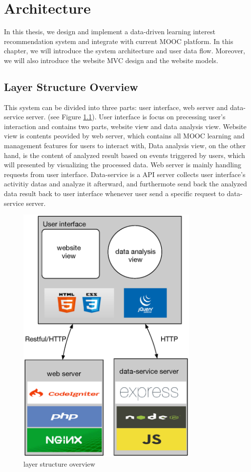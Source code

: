 \chapter{Architecture}
In this thesis, we design and implement a data-driven learning interest recommendation system and integrate with current MOOC platform.
In this chapter, we  will introduce the system architecture and user data flow.
Moreover, we will also introduce the website MVC design and the website models.

\section{Layer Structure Overview}
This system can be divided into three parts: user interface, web server and data-service server. (see Figure \ref{fig:layer-overview}).
User interface is focus on precessing user's interaction and contains two parts, website view and data analysis view.
Website view is contents peovided by web server, which contains all MOOC learning and management features for users to interact with,
Data analysis view, on the other hand, is the content of analyzed result based on events triggered by users, which will presented by visualizing the processed data.
Web server is mainly handling requests from user interface.
Data-service is a API server collects user interface's activitiy datas and analyze it afterward, and furthermote send back the analyzed data result back to user interface whenever user send a specific request to data-service server.

\begin{figure}[H]
    \centering
    \includegraphics[width = 0.8\textwidth]{fig/layer-structure-overview.eps}
    \caption{layer structure overview}
    \label{fig:layer-overview}
\end{figure}

